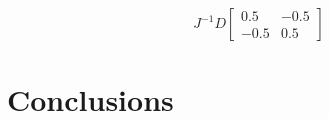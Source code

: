\documentclass[11pt]{article}
\begin{document}
\begin{equation}
J^{-1}D
\begin{bmatrix}

0.5 & -0.5 \\
-0.5 & 0.5
\end{bmatrix}
\end{equation}


\section{Conclusions}










\pagebreak
\end{document}
